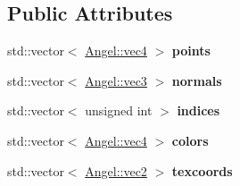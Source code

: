 \subsection*{Public Attributes}
\begin{DoxyCompactItemize}
\item 
\hypertarget{class_object_a8dec70177d147f59ba10c9eba8e9191b}{std\-::vector$<$ \hyperlink{struct_angel_1_1vec4}{Angel\-::vec4} $>$ {\bfseries points}}\label{class_object_a8dec70177d147f59ba10c9eba8e9191b}

\item 
\hypertarget{class_object_ad541a7bb180e24f59d752cc6d7f8c7e8}{std\-::vector$<$ \hyperlink{struct_angel_1_1vec3}{Angel\-::vec3} $>$ {\bfseries normals}}\label{class_object_ad541a7bb180e24f59d752cc6d7f8c7e8}

\item 
\hypertarget{class_object_a9b2fb19d129ad79407f9af0eea05b96c}{std\-::vector$<$ unsigned int $>$ {\bfseries indices}}\label{class_object_a9b2fb19d129ad79407f9af0eea05b96c}

\item 
\hypertarget{class_object_a4de4c1e2c4b621efb6f5d1b398ac6835}{std\-::vector$<$ \hyperlink{struct_angel_1_1vec4}{Angel\-::vec4} $>$ {\bfseries colors}}\label{class_object_a4de4c1e2c4b621efb6f5d1b398ac6835}

\item 
\hypertarget{class_object_a6d6c58ccb93f7a2bd7439d081134aaa0}{std\-::vector$<$ \hyperlink{struct_angel_1_1vec2}{Angel\-::vec2} $>$ {\bfseries texcoords}}\label{class_object_a6d6c58ccb93f7a2bd7439d081134aaa0}

\end{DoxyCompactItemize}
